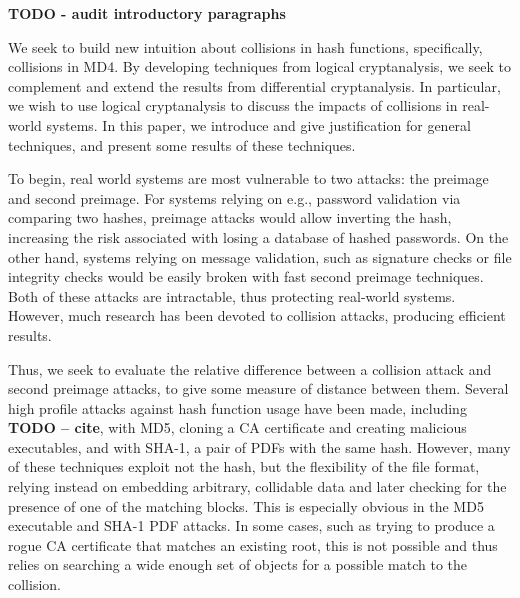 \documentclass[conference]{IEEEtran}
\begin{document}
\textbf{TODO - audit introductory paragraphs}

We seek to build new intuition about collisions in hash functions,
specifically, collisions in MD4. By developing techniques from logical
cryptanalysis, we seek to complement and extend the results from
differential cryptanalysis. In particular, we wish to use logical cryptanalysis
to discuss the impacts of collisions in real-world systems. In this paper,
we introduce and give justification for general techniques, and present some
results of these techniques.

To begin, real world systems are most vulnerable to two attacks: the preimage
and second preimage. For systems relying on e.g., password validation via
comparing two hashes, preimage attacks would allow inverting the hash,
increasing the risk associated with losing a database of hashed passwords.
On the other hand, systems relying on message validation, such as signature
checks or file integrity checks would be easily broken with fast second
preimage techniques. Both of these attacks are intractable, thus protecting
real-world systems. However, much research has been devoted to collision
attacks, producing efficient results.

Thus, we seek to evaluate the relative difference between a collision
attack and second preimage attacks, to give some measure of distance between
them. Several high profile attacks against hash function usage have been
made, including \textbf{TODO -- cite}, with MD5, cloning a CA certificate
and creating malicious executables, and with SHA-1, a pair of PDFs with the
same hash. However, many of these techniques exploit not the hash, but the
flexibility of the file format, relying instead on embedding arbitrary,
collidable data and later checking for the presence of one of the matching
blocks. This is especially obvious in the MD5 executable and SHA-1 PDF attacks.
In some cases, such as trying to produce a rogue CA certificate that matches
an existing root, this is not possible and thus relies on searching a wide
enough set of objects for a possible match to the collision.
\end{document}
